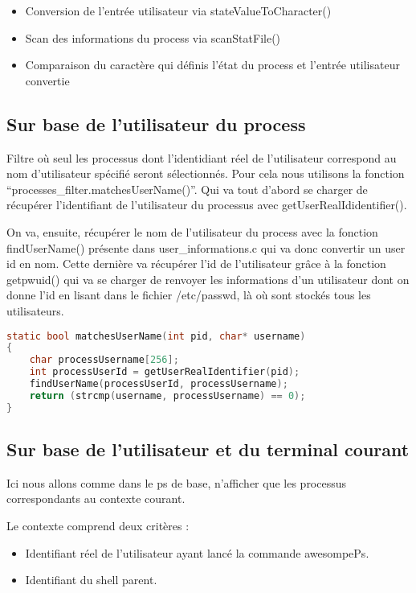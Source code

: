 \begin{itemize}
\item Conversion de l'entrée utilisateur via stateValueToCharacter()
\item Scan des informations du process via scanStatFile()
\item Comparaison du caractère qui définis l'état du process et l'entrée utilisateur convertie
\end{itemize}


\subsection{Sur base de l’utilisateur du process}
Filtre où seul les processus dont l’identidiant réel de l'utilisateur correspond au nom d'utilisateur spécifié seront sélectionnés. Pour cela nous utilisons la fonction “processes\_filter.matchesUserName()”. Qui va tout d’abord se charger de récupérer l’identifiant de l’utilisateur du processus avec getUserRealIdidentifier().

On va, ensuite, récupérer le nom de l'utilisateur du process avec la fonction findUserName() présente dans user\_informations.c qui va donc convertir un user id en nom. Cette dernière va récupérer l'id de l'utilisateur grâce à la fonction getpwuid() qui va se charger de renvoyer les informations d'un utilisateur dont on donne l'id en lisant dans le fichier /etc/passwd, là où sont stockés tous les utilisateurs.

\begin{lstlisting}[frame=single, language=c]
static bool matchesUserName(int pid, char* username)
{
    char processUsername[256];
    int processUserId = getUserRealIdentifier(pid);
    findUserName(processUserId, processUsername);
    return (strcmp(username, processUsername) == 0);
}
\end{lstlisting}



\subsection{Sur base de l’utilisateur et du terminal courant} 

Ici nous allons comme dans le ps de base, n'afficher que les processus correspondants au contexte courant. 

Le contexte comprend deux critères :
\begin{itemize}
\item Identifiant réel de l'utilisateur ayant lancé la commande awesompePs.
\item Identifiant du shell parent.
\end{itemize} 

